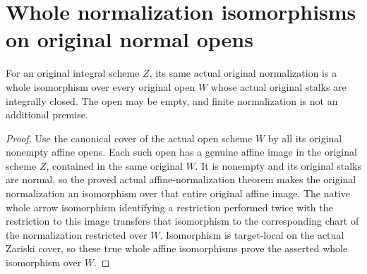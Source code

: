\section{Whole normalization isomorphisms on original normal opens}

\begin{theorem}
\label{thm:actual-normalization-isomorphism-normal-open}
\leanok
{}
For an original integral scheme $Z$, its same actual original normalization
is a whole isomorphism over every original open $W$ whose actual original
stalks are integrally closed. The open may be empty, and finite normalization
is not an additional premise.
\end{theorem}
\begin{proof}
Use the canonical cover of the actual open scheme $W$ by all its original
nonempty affine opens. Each such open has a genuine affine image in the
original scheme $Z$, contained in the same original $W$. It is nonempty and
its original stalks are normal, so the proved actual affine-normalization
theorem makes the original normalization an isomorphism over that entire
original affine image. The native whole arrow isomorphism identifying a
restriction performed twice with the restriction to this image transfers
that isomorphism to the corresponding chart of the normalization restricted
over $W$. Isomorphism is target-local on the actual Zariski cover, so these
true whole affine isomorphisms prove the asserted whole isomorphism over $W$.
\end{proof}
